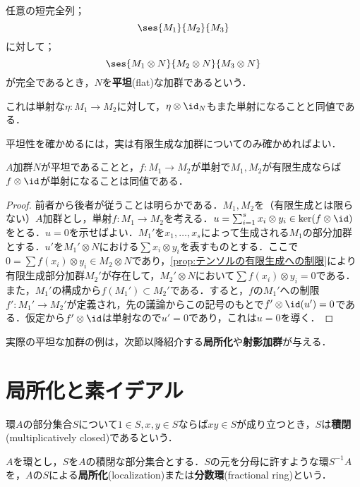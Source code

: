 \begin{defi}[平坦加群]
	任意の短完全列；
	\[\ses{M_1}{M_2}{M_3}\]
	に対して；
	\[\ses{M_1\otimes N}{M_2\otimes N}{M_3\otimes N}\]
	が完全であるとき，$N$を\textbf{平坦}(flat)な加群であるという．
\end{defi}

これは単射な$\eta:M_1\to M_2$に対して，$\eta\otimes\id_{N}$もまた単射になることと同値である．

平坦性を確かめるには，実は有限生成な加群についてのみ確かめればよい．

\begin{prop}\label{prop:平坦性は有限生成を調べれば良い}
	$A$加群$N$が平坦であることと，$f:M_1\to M_2$が単射で$M_1,M_2$が有限生成ならば$f\otimes\id$が単射になることは同値である．
\end{prop}

\begin{proof}
	前者から後者が従うことは明らかである．$M_1,M_2$を（有限生成とは限らない）$A$加群とし，単射$f:M_1\to M_2$を考える．$u=\sum_{i=1}^s x_i\otimes y_i\in\ker(f\otimes\id)$をとる．$u=0$を示せばよい．$M_1'$を$x_1,\dots,x_s$によって生成される$M_1$の部分加群とする．$u'$を$M_1'\otimes N$における$\sum x_i\otimes y_i$を表すものとする．ここで$0=\sum f(x_i)\otimes y_i\in M_2\otimes N$であり，\ref{prop:テンソルの有限生成への制限}により有限生成部分加群$M_2'$が存在して，$M_2'\otimes N$において$\sum f(x_i)\otimes y_i=0$である．また，$M_1'$の構成から$f(M_1')\subset M_2'$である．すると，$f$の$M_1'$への制限$f':M_1'\to M_2'$が定義され，先の議論からこの記号のもとで$f'\otimes\id(u')=0$である．仮定から$f'\otimes\id$は単射なので$u'=0$であり，これは$u=0$を導く．
\end{proof}

実際の平坦な加群の例は，次節以降紹介する\textbf{局所化}や\textbf{射影加群}が与える．

\section{局所化と素イデアル}

\begin{defi}[積閉集合]
	環$A$の部分集合$S$について$1\in S,x,y\in S$ならば$xy\in S$が成り立つとき，$S$は\textbf{積閉}(multiplicatively closed)であるという．
\end{defi}

\begin{defi}[局所化]
	$A$を環とし，$S$を$A$の積閉な部分集合とする．$S$の元を分母に許すような環$S^{-1}A$を，$A$の$S$による\textbf{局所化}(localization)または\textbf{分数環}(fractional ring)という．
\end{defi}

